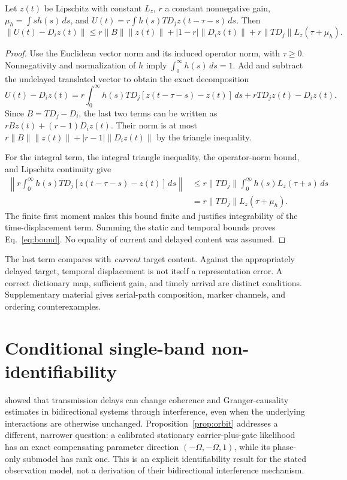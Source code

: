 \documentclass[submission,nolinenumbers]{esj}
\newcommand{\Di}{D_i}
\begin{document}
\begin{proposition}\label{prop:bound}
Let $z(t)$ be Lipschitz with constant $L_z$, $r$ a constant nonnegative gain, $\mu_h=\int s h(s)\,ds$, and $U(t)=r\int h(s)TD_j z(t-\tau-s)\,ds$. Then
\begin{equation}
\|U(t)-\Di z(t)\|\le r\|B\|\|z(t)\|+|1-r|\|\Di z(t)\|
+r\|TD_j\|L_z(\tau+\mu_h).\label{eq:bound}
\end{equation}
\end{proposition}
\begin{proof}
Use the Euclidean vector norm and its induced operator norm, with $\tau\ge0$. Nonnegativity and normalization of $h$ imply $\int_0^\infty h(s)\,ds=1$. Add and subtract the undelayed translated vector to obtain the exact decomposition
\[
U(t)-D_iz(t)=r\int_0^\infty h(s)TD_j[z(t-\tau-s)-z(t)]\,ds
+rTD_jz(t)-D_iz(t).
\]
Since $B=TD_j-D_i$, the last two terms can be written as $rBz(t)+(r-1)D_iz(t)$. Their norm is at most $r\|B\|\|z(t)\|+|r-1|\|D_iz(t)\|$ by the triangle inequality.

For the integral term, the integral triangle inequality, the operator-norm bound, and Lipschitz continuity give
\begin{align*}
\left\|r\int_0^\infty h(s)TD_j[z(t-\tau-s)-z(t)]\,ds\right\|
&\le r\|TD_j\|\int_0^\infty h(s)L_z(\tau+s)\,ds\\
&=r\|TD_j\|L_z(\tau+\mu_h).
\end{align*}
The finite first moment makes this bound finite and justifies integrability of the time-displacement term. Summing the static and temporal bounds proves Eq.~\eqref{eq:bound}. No equality of current and delayed content was assumed.
\end{proof}
The last term compares with \emph{current} target content. Against the appropriately delayed target, temporal displacement is not itself a representation error. A correct dictionary map, sufficient gain, and timely arrival are distinct conditions. Supplementary material gives serial-path composition, marker channels, and ordering counterexamples.

\section{Conditional single-band non-identifiability}\label{sec:phase}
\citet{dowdall2023} showed that transmission delays can change coherence and Granger-causality estimates in bidirectional systems through interference, even when the underlying interactions are otherwise unchanged. Proposition~\ref{prop:orbit} addresses a different, narrower question: a calibrated stationary carrier-plus-gate likelihood has an exact compensating parameter direction $(-\Omega,-\Omega,1)$, while its phase-only submodel has rank one. This is an explicit identifiability result for the stated observation model, not a derivation of their bidirectional interference mechanism.
\end{document}
